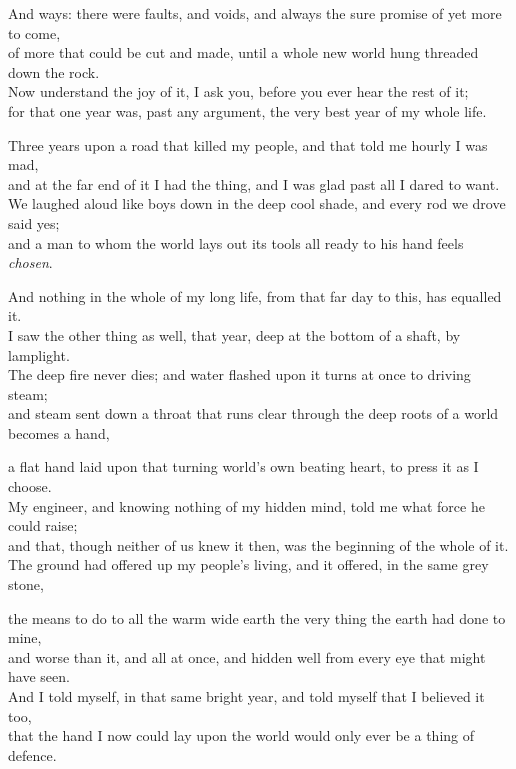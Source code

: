 \begin{scripture}
And ways: there were faults, and voids, and always the sure promise of yet more to come, \\
of more that could be cut and made, until a whole new world hung threaded down the rock. \\
Now understand the joy of it, I ask you, before you ever hear the rest of it; \\
for that one year was, past any argument, the very best year of my whole life. \\
\medskip

Three years upon a road that killed my people, and that told me hourly I was mad, \\
and at the far end of it I had the thing, and I was glad past all I dared to want. \\
We laughed aloud like boys down in the deep cool shade, and every rod we drove said yes; \\
and a man to whom the world lays out its tools all ready to his hand feels \emph{chosen}. \\
\medskip

And nothing in the whole of my long life, from that far day to this, has equalled it. \\
I saw the other thing as well, that year, deep at the bottom of a shaft, by lamplight. \\
The deep fire never dies; and water flashed upon it turns at once to driving steam; \\
and steam sent down a throat that runs clear through the deep roots of a world becomes a hand, \\
\medskip

a flat hand laid upon that turning world's own beating heart, to press it as I choose. \\
My engineer, and knowing nothing of my hidden mind, told me what force he could raise; \\
and that, though neither of us knew it then, was the beginning of the whole of it. \\
The ground had offered up my people's living, and it offered, in the same grey stone, \\
\medskip

the means to do to all the warm wide earth the very thing the earth had done to mine, \\
and worse than it, and all at once, and hidden well from every eye that might have seen. \\
And I told myself, in that same bright year, and told myself that I believed it too, \\
that the hand I now could lay upon the world would only ever be a thing of defence. \\
\end{scripture}

